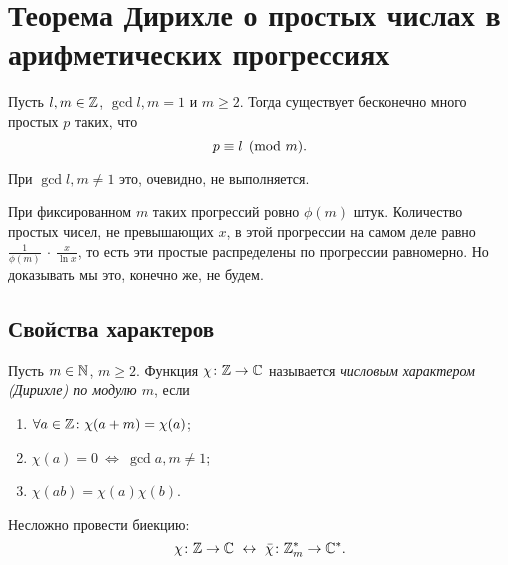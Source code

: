 \section{Теорема Дирихле о простых числах в арифметических прогрессиях}
\label{sec:II_Dirichlet-theorem}


\begin{ntheorem}[Дирихле]
\label{thm:II-1}
    Пусть $l,m \in \mathbb{Z}$, $\gcd{l, m} = 1$ и $m \ge 2$. Тогда существует бесконечно много простых $p$ таких, что 
    \[
        p \equiv l \pmod m.
    \]
\end{ntheorem}

\begin{remark}
    При $\gcd{l, m} \ne 1$ это, очевидно, не выполняется.
\end{remark}

\begin{remark}
    При фиксированном $m$ таких прогрессий ровно $\phi(m)$ штук. Количество простых чисел, не превышающих $x$, в этой прогрессии на самом деле равно $\frac{1}{\phi(m)}~\cdot~\frac{x}{\ln{x}}$, то есть эти простые распределены по прогрессии равномерно. Но доказывать мы это, конечно же, не будем.
\end{remark}


\subsection{Свойства характеров}
\label{subsec:1_character-properties}

\begin{ndefinition}
\label{def:II_Dirichlet-character}
    Пусть $m \in \mathbb{N}$, $m \ge 2$. Функция $\chi\colon \mathbb{Z} \to \mathbb{C}$ называется \emph{числовым характером (Дирихле) по модулю $m$}, если
    \begin{enumerate}
        \item 
            $\forall a \in \mathbb{Z}\colon \chi(a+m) = \chi(a)$;
        \item 
            $\chi(a) = 0 \ \Leftrightarrow \ \gcd{a, m} \ne 1$;
        \item 
            $\chi(ab) = \chi(a)\chi(b)$.
    \end{enumerate}
\end{ndefinition}

\begin{remark}
    Несложно провести биекцию:
    \[
        \chi\colon \ZZ \to \CC 
        \ \leftrightarrow \ 
        \bar{\chi}\colon \ZZ_{m}^{\ast} \to \CC^{\ast}.
    \]
\end{remark}


